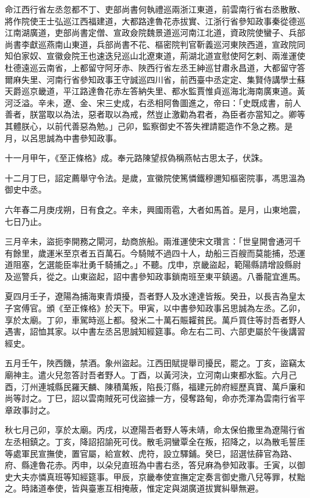\begin{pinyinscope}
 命江西行省左丞忽都不丁、吏部尚書何執禮巡兩浙江東道，前雲南行省右丞散散、將作院使王士弘巡江西福建道，大都路達魯花赤拔實、江浙行省參知政事秦從德巡江南湖廣道，吏部尚書定僧、宣政僉院魏景道巡河南江北道，資政院使蠻子、兵部尚書李獻巡燕南山東道，兵部尚書不花、樞密院判官靳義巡河東陜西道，宣政院同知伯家奴、宣徽僉院王也速迭兒巡山北遼東道，荊湖北道宣慰使阿乞剌、兩淮運使杜德遠巡云南省，上都留守阿牙赤、陜西行省左丞王紳巡甘肅永昌道，大都留守答爾麻失里、河南行省參知政事王守誠巡四川省，前西臺中丞定定、集賢侍講學士蘇天爵巡京畿道，平江路達魯花赤左答納失里、都水監賈惟貞巡海北海南廣東道。黃河泛溢。辛未，遼、金、宋三史成，右丞相阿魯圖進之，帝曰：「史既成書，前人善者，朕當取以為法，惡者取以為戒，然豈止激勸為君者，為臣者亦當知之。卿等其體朕心，以前代善惡為勉。」己卯，監察御史不答失裡請罷造作不急之務。是月，以呂思誠為中書參知政事。



 十一月甲午，《至正條格》成。奉元路陳望叔偽稱燕帖古思太子，伏誅。



 十二月丁巳，詔定薦舉守令法。是歲，宣徽院使篤憐鐵穆邇知樞密院事，馮思溫為御史中丞。



 六年春二月庚戌朔，日有食之。辛未，興國雨雹，大者如馬首。是月，山東地震，七日乃止。



 三月辛未，盜扼李開務之閘河，劫商旅船。兩淮運使宋文瓚言：「世皇開會通河千有餘里，歲運米至京者五百萬石。今騎賊不過四十人，劫船三百艘而莫能捕，恐運道阻塞，乞選能臣率壯勇千騎捕之。」不聽。戊申，京畿盜起，範陽縣請增設縣尉及巡警兵，從之。山東盜起，詔中書參知政事鎖南班至東平鎮遏。八番龍宜進馬。



 夏四月壬子，遼陽為捕海東青煩擾，吾者野人及水達達皆叛。癸丑，以長吉為皇太子宮傅官。頒《至正條格》於天下。甲寅，以中書參知政事呂思誠為左丞。乙卯，享於太廟。丁卯，車駕時巡上都。發米二十萬石賑糶貧民。萬戶買住等討吾者野人遇害，詔恤其家。以中書左丞呂思誠知經筵事。命左右二司、六部吏屬於午後講習經史。



 五月壬午，陜西饑，禁酒。象州盜起。江西田賦提舉司擾民，罷之。丁亥，盜竊太廟神主。遣火兒忽答討吾者野人。丁酉，以黃河決，立河南山東都水監。六月己酉，汀州連城縣民羅天麟、陳積萬叛，陷長汀縣，福建元帥府經歷真寶、萬戶廉和尚等討之。丁巳，詔以雲南賊死可伐盜據一方，侵奪路甸，命亦禿渾為雲南行省平章政事討之。



 秋七月己卯，享於太廟。丙戌，以遼陽吾者野人等未靖，命太保伯撒里為遼陽行省左丞相鎮之。丁亥，降詔招諭死可伐。散毛洞蠻覃全在叛，招降之，以為散毛誓厓等處軍民宣撫使，置官屬，給宣敕、虎符，設立驛鋪。癸巳，詔選怯薛官為路、府、縣達魯花赤。丙申，以朵兒直班為中書右丞，答兒麻為參知政事。壬寅，以御史大夫亦憐真班等知經筵事。甲辰，京畿奉使宣撫定定奏言御史撒八兒等罪，杖黜之。時諸道奉使，皆與臺憲互相掩蔽，惟定定與湖廣道拔實糾舉無避。




\end{pinyinscope}
